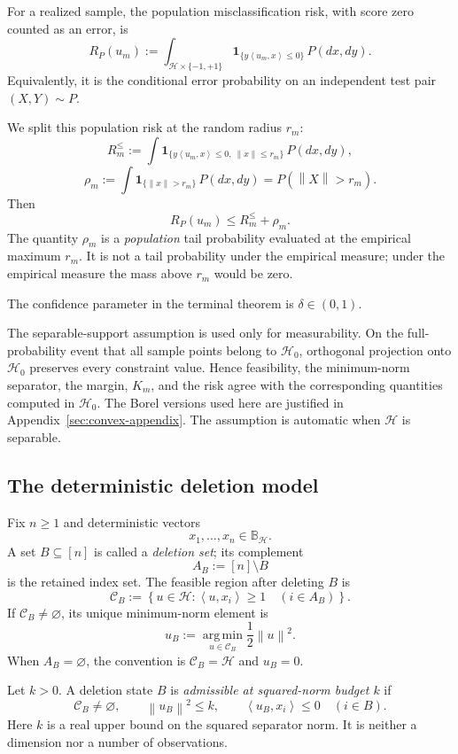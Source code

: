 \documentclass[11pt]{article}
\theoremstyle{definition}
\theoremstyle{remark}
\newcommand{\Hh}{\mathcal H}
\newcommand{\one}{\mathbf 1}
\newcommand{\ip}[2]{\left\langle #1,#2\right\rangle}
\newcommand{\norm}[1]{\left\lVert #1\right\rVert}
\newcommand{\argminop}{\operatorname*{arg\,min}}
\newcommand{\Risk}{R_P}
\begin{document}
For a realized sample, the population misclassification risk, with score
zero counted as an error, is
\[
 \Risk(u_m)
 :=
 \int_{\Hh\times\{-1,+1\}}
 \one_{\{y\ip{u_m}{x}\le0\}}\,P(dx,dy).
\]
Equivalently, it is the conditional error probability on an independent test
pair \((X,Y)\sim P\).

We split this population risk at the random radius \(r_m\):
\[
 R_m^{\le}
 :=
 \int
 \one_{\{y\ip{u_m}{x}\le0,\ \norm x\le r_m\}}\,P(dx,dy),
\]
\[
 \rho_m
 :=
 \int
 \one_{\{\norm x>r_m\}}\,P(dx,dy)
 =
 P(\norm X>r_m).
\]
Then
\[
 \Risk(u_m)\le R_m^{\le}+\rho_m.
 \tag{2.1}\label{eq:risk-split}
\]
The quantity \(\rho_m\) is a \emph{population} tail probability evaluated at
the empirical maximum \(r_m\). It is not a tail probability under the
empirical measure; under the empirical measure the mass above \(r_m\) would
be zero.

The confidence parameter in the terminal theorem is
\(\delta\in(0,1)\).

The separable-support assumption is used only for measurability. On the
full-probability event that all sample points belong to \(\Hh_0\), orthogonal
projection onto \(\Hh_0\) preserves every constraint value. Hence
feasibility, the minimum-norm separator, the margin, \(K_m\), and the risk
agree with the corresponding quantities computed in \(\Hh_0\). The Borel
versions used here are justified in Appendix~\ref{sec:convex-appendix}. The
assumption is automatic when \(\Hh\) is separable.

\subsection{The deterministic deletion model}

Fix \(n\ge1\) and deterministic vectors
\[
 x_1,\ldots,x_n\in\mathbb B_{\Hh}.
\]
A set \(B\subseteq[n]\) is called a \emph{deletion set}; its complement
\[
 A_B:=[n]\setminus B
\]
is the retained index set. The feasible region after deleting \(B\) is
\[
 \mathcal C_B
 :=
 \left\{
   u\in\Hh:
   \ip{u}{x_i}\ge1\quad(i\in A_B)
 \right\}.
\]
If \(\mathcal C_B\ne\varnothing\), its unique minimum-norm element is
\[
 u_B
 :=
 \argminop_{u\in\mathcal C_B}\frac12\norm u^2.
\]
When \(A_B=\varnothing\), the convention is
\(\mathcal C_B=\Hh\) and \(u_B=0\).

Let \(k>0\). A deletion state \(B\) is \emph{admissible at squared-norm
budget \(k\)} if
\[
 \mathcal C_B\ne\varnothing,
 \qquad
 \norm{u_B}^2\le k,
 \qquad
 \ip{u_B}{x_i}\le0\quad(i\in B).
 \tag{2.2}
\]
Here \(k\) is a real upper bound on the squared separator norm. It is neither
a dimension nor a number of observations.
\end{document}
